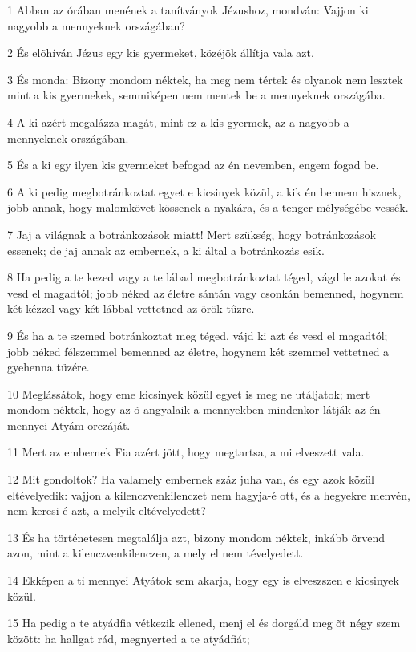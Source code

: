 \par 1 Abban az órában menének a tanítványok Jézushoz, mondván: Vajjon ki nagyobb a mennyeknek országában?
\par 2 És elõhíván Jézus egy kis gyermeket, közéjök állítja vala azt,
\par 3 És monda: Bizony mondom néktek, ha meg nem tértek és olyanok nem lesztek mint a kis gyermekek, semmiképen nem mentek be a mennyeknek országába.
\par 4 A ki azért megalázza magát, mint ez a kis gyermek, az a nagyobb a mennyeknek országában.
\par 5 És a ki egy ilyen kis gyermeket befogad az én nevemben, engem fogad be.
\par 6 A ki pedig megbotránkoztat egyet e kicsinyek közül, a kik én bennem hisznek, jobb annak, hogy malomkövet kössenek a nyakára, és a tenger mélységébe vessék.
\par 7 Jaj a világnak a botránkozások miatt! Mert szükség, hogy botránkozások essenek; de jaj annak az embernek, a ki által a botránkozás esik.
\par 8 Ha pedig a te kezed vagy a te lábad megbotránkoztat téged, vágd le azokat és vesd el magadtól; jobb néked az életre sántán vagy csonkán bemenned, hogynem két kézzel vagy két lábbal vettetned az örök tûzre.
\par 9 És ha a te szemed botránkoztat meg téged, vájd ki azt és vesd el magadtól; jobb néked félszemmel bemenned az életre, hogynem két szemmel vettetned a gyehenna tüzére.
\par 10 Meglássátok, hogy eme kicsinyek közül egyet is meg ne utáljatok; mert mondom néktek, hogy az õ angyalaik a mennyekben mindenkor látják az én mennyei Atyám orczáját.
\par 11 Mert az embernek Fia azért jött, hogy megtartsa, a mi elveszett vala.
\par 12 Mit gondoltok? Ha valamely embernek száz juha van, és egy azok közül eltévelyedik: vajjon a kilenczvenkilenczet nem hagyja-é ott, és a hegyekre menvén, nem keresi-é azt, a melyik eltévelyedett?
\par 13 És ha történetesen megtalálja azt, bizony mondom néktek, inkább örvend azon, mint a kilenczvenkilenczen, a mely el nem tévelyedett.
\par 14 Ekképen a ti mennyei Atyátok sem akarja, hogy egy is elveszszen e kicsinyek közül.
\par 15 Ha pedig a te atyádfia vétkezik ellened, menj el és dorgáld meg õt négy szem között: ha hallgat rád, megnyerted a te atyádfiát;
